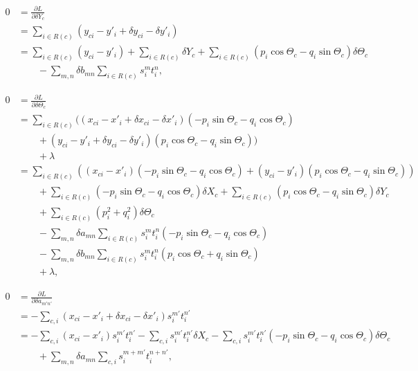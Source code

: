 \documentclass{scrartcl}
\begin{document}
\begin{align}
    0
    &= \frac{\partial L}{\partial \delta Y_{c}}
\\  &= \sum_{i \in R(c)} \left( y_{ci} - y'_i + \delta y_{ci} - \delta y'_i\right)
\\  &= \sum_{i \in R(c)} \left( y_{ci} - y'_i \right)
        + \sum_{i \in R(c)} \delta Y_{c}
        + \sum_{i \in R(c)} \left(p_i \cos \Theta_c - q_i \sin \Theta_c \right) \delta \Theta_c
            \nonumber \\ & \qquad
        - \sum_{m,n} \delta b_{mn} \sum_{i \in R(c)} s_i^{m} t_i^{n}
,
\end{align}

\begin{align}
    0
    &= \frac{\partial L}{\partial \delta \Theta_{c}}
\\  &= \sum_{i \in R(c)} \Big(
          \left( x_{ci} - x'_i + \delta x_{ci} - \delta x'_i \right) \left(-p_i \sin \Theta_c - q_i \cos \Theta_c \right)
            \nonumber \\ & \qquad
        + \left( y_{ci} - y'_i + \delta y_{ci} - \delta y'_i \right) \left( p_i \cos \Theta_c - q_i \sin \Theta_c \right)
        \Big)
            \nonumber \\ & \qquad
        + \lambda
\\  &= \sum_{i \in R(c)} \left(
            \left(x_{ci} - x'_i \right) \left(-p_i \sin \Theta_c - q_i \cos \Theta_c \right)
           +\left(y_{ci} - y'_i \right) \left( p_i \cos \Theta_c - q_i \sin \Theta_c \right)
        \right)
            \nonumber \\ & \qquad
        + \sum_{i \in R(c)} \left(-p_i \sin \Theta_c - q_i \cos \Theta_c \right) \delta X_{c}
        + \sum_{i \in R(c)} \left( p_i \cos \Theta_c - q_i \sin \Theta_c \right) \delta Y_{c}
            \nonumber \\ & \qquad
        + \sum_{i \in R(c)} \left(p_i^2 + q_i^2\right) \delta \Theta_c
            \nonumber \\ & \qquad
        - \sum_{m,n} \delta a_{mn} \sum_{i \in R(c)} s_i^{m} t_i^{n}
            \left(- p_i \sin \Theta_c - q_i \cos \Theta_c \right)
            \nonumber \\ & \qquad
        - \sum_{m,n} \delta b_{mn} \sum_{i \in R(c)} s_i^{m} t_i^{n}
            \left( p_i \cos \Theta_c + q_i \sin \Theta_c \right)
            \nonumber \\ & \qquad
        + \lambda
,
\end{align}

\begin{align}
    0
    &=\frac{\partial L}{\partial \delta a_{m'n'}}
\\  &= - \sum_{c,i} \left( x_{ci} - x'_i + \delta x_{ci} - \delta x'_i \right) s_i^{m'} t_i^{n'}
\\  &= - \sum_{c,i} (x_{ci} - x'_i) s_i^{m'} t_i^{n'}
        - \sum_{c,i} s_i^{m'} t_i^{n'} \delta X_{c}
        - \sum_{c,i} s_i^{m'} t_i^{n'} \left(-p_i \sin \Theta_c - q_i \cos \Theta_c \right) \delta \Theta_c
            \nonumber \\ & \qquad
        + \sum_{m,n} \delta a_{mn} \sum_{c,i} s_i^{m+m'} t_i^{n+n'}
,
\end{align}
\end{document}
